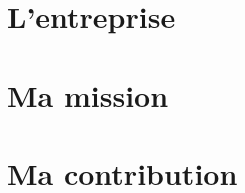 \documentclass[12pt]{report}
\begin{document}
	

	
	
	\tableofcontents
	
	\part{L'entreprise}
		
		
	\part{Ma mission}
		
		
	\part{Ma contribution}
		
		
\end{document}
